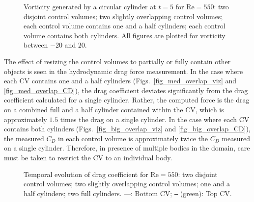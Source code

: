 \documentclass[review]{elsarticle}
\def \Re{\text{Re}}
\begin{document}
\begin{figure}[H]
  \centering
  \caption{Vorticity generated by a circular cylinder at $t=5$ for $\Re = 550$: 
   two disjoint control volumes;
   two slightly overlapping control volumes;
   each control volume contains one and a half cylinders;
   each control volume contains both cylinders.
   All figures are plotted for vorticity between $-20$ and $20$.
   }
  \label{fig_cv_configurations}
\end{figure}


The effect of resizing the control volumes to partially or fully contain other objects
is seen in the hydrodynamic drag force measurement.  
In the case where each CV contains one and a half cylinders 
(Figs.~\ref{fig_med_overlap_viz} and \ref{fig_med_overlap_CD}), 
the drag coefficient deviates significantly from the drag coefficient calculated for 
a single cylinder. Rather, the computed force is the drag on a combined full and 
a half cylinder contained within the CV, which is approximately 
$1.5$ times the drag on a single cylinder. In the case
where each CV contains both cylinders (Figs.~\ref{fig_big_overlap_viz} and 
\ref{fig_big_overlap_CD}), the measured $C_D$ in each control
volume is approximately twice the $C_D$ measured on a single cylinder.
Therefore, in presence of multiple bodies in the domain, care must be 
taken to restrict the CV to an individual body.

\begin{figure}[H]
  \centering
  \caption{Temporal evolution of drag coefficient for $\Re = 550$:
   two disjoint control volumes; 
    two slightly overlapping control volumes; 
    one and a half cylinders;
    two full cylinders. 
   ---: Bottom CV;
   \texttt{---} (green): Top CV.}
  \label{fig_CD_cylinder_cv_configurations}
\end{figure}
\end{document}
